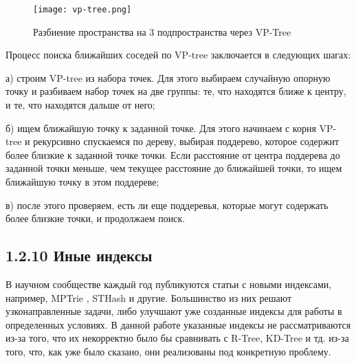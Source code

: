 \par\vspace{1em}
\begin{figure}[H]
    \centering
    \texttt{[image: vp-tree.png]}
    \caption{Разбиение пространства на 3 подпространства через VP-Tree}
\end{figure}
  
Процесс поиска ближайших соседей по VP-tree заключается в следующих шагах:
\par а) строим VP-tree из набора точек. Для этого выбираем случайную опорную точку и разбиваем набор точек на две группы: те, что находятся ближе к центру, и те, что находятся дальше от него;
\par б) ищем ближайшую точку к заданной точке. Для этого начинаем с корня VP-tree и рекурсивно спускаемся по дереву, выбирая поддерево, которое содержит более близкие к заданной точке точки. Если расстояние от центра поддерева до заданной точки меньше, чем текущее расстояние до ближайшей точки, то ищем ближайшую точку в этом поддереве;
\par в) после этого проверяем, есть ли еще поддеревья, которые могут содержать более близкие точки, и продолжаем поиск.


\subsection{1.2.10 Иные индексы}
В научном сообществе каждый год публикуются статьи с новыми индексами, например, MPTrie \cite{gantiMPTrie}, STHash\cite{guanSTHash} и другие. Большинство из них решают узконаправленные задачи, либо улучшают уже созданные индексы для работы в определенных условиях. В данной работе указанные индексы не рассматриваются из-за того, что их некорректно было бы сравнивать с R-Tree, KD-Tree и тд. из-за того, что, как уже было сказано, они реализованы под конкретную проблему. 